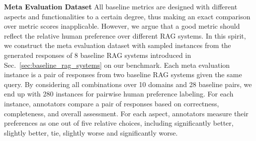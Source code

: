 \textbf{Meta Evaluation Dataset} All baseline metrics are designed with different aspects and functionalities to a certain degree, thus making an exact comparison over metric scores inapplicable. However, we argue that a good metric should reflect the relative human preference over different RAG systems.
In this spirit, we construct the meta evaluation dataset with sampled instances from the generated responses of 8 baseline RAG systems introduced in Sec.~\ref{sec:baseline_rag_systems} on our benchmark. Each meta evaluation instance is a pair of responses from two baseline RAG systems given the same query. By considering all combinations over 10 domains and 28 baseline pairs, we end up with 280 instances for pairwise human preference labeling.
For each instance, annotators compare a pair of responses based on correctness, completeness, and overall assessment. For each aspect, annotators measure their preferences as one out of five relative choices, including significantly better, slightly better, tie, slightly worse and significantly worse.
